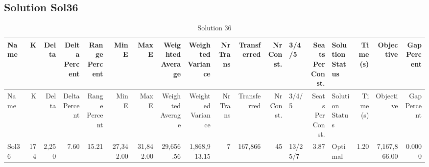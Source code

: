 \documentclass[a4paper]{article}
\begin{document}
\clearpage
\subsection{Solution Sol36}

{\scriptsize
\begin{longtable}{lrrrrrrrrrrrlrlrrr}
\caption{Solution 36}
\\ \toprule
Name &K &Delta &\shortstack{Delta\\Percent} &\shortstack{Range\\Percent} &Min E &Max E &\shortstack{Weighted\\Average} &\shortstack{Weighted\\Variance} &\shortstack{Nr\\Trans} &Transferred &\shortstack{Nr\\Const.} &3/4/5 &\shortstack{Seats\\Per\\Const.} &\shortstack{Solution\\Status} &\shortstack{Time\\(s)} &Objective &\shortstack{Gap\\Percent} \\ \midrule
\endfirsthead
\toprule
Name &K &Delta &\shortstack{Delta\\Percent} &\shortstack{Range\\Percent} &Min E &Max E &\shortstack{Weighted\\Average} &\shortstack{Weighted\\Variance} &\shortstack{Nr\\Trans} &Transferred &\shortstack{Nr\\Const.} &3/4/5 &\shortstack{Seats\\Per\\Const.} &\shortstack{Solution\\Status} &\shortstack{Time\\(s)} &Objective &\shortstack{Gap\\Percent} \\ \midrule
\endhead
\bottomrule
\endfoot
Sol36&174&2,250& 7.60&15.21&27,342.00&31,842.00&29,656.56&1,868,913.15&7&167,866&45&13/25/7& 3.87&Optimal& 1.20&7,167,866.00&0.0000\\ 
\end{longtable}

}
\end{document}
